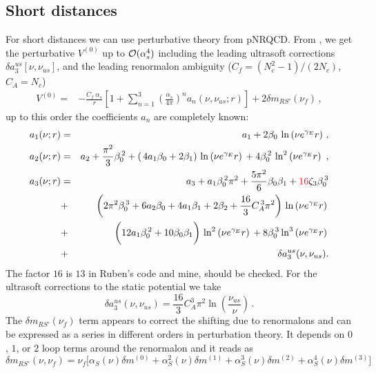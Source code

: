 \documentclass[11pt, a4paper]{article}
\begin{document}
\subsection{Short distances}
For short distances we can use perturbative theory from pNRQCD. From \cite{Pineda:2013lta}, we get the perturbative $V^{(0)}$ up to ${\cal O}(\alpha_s^4)$ including the leading ultrasoft corrections $\delta a_3^{us}[\nu,\nu_{us}]$, and the leading renormalon ambiguity ($C_f=(N_c^2-1)/(2N_c)$, $C_A=N_c$)
\begin{align}
    V^{(0)}=&
-\frac{C_f \ \alpha_s}{r}\left[1+
\sum_{n=1}^{3} 
\left(\frac{\alpha_s}{4\pi}\right)^n a_{n}(\nu,\nu_{us} ; r)\right]+2 \delta m_{RS'}(\nu_f) \, ,
\end{align}
up to this order the coefficients $a_n$ are completely known:
\begin{eqnarray}
a_1(\nu;r)
&=&
a_1+2\beta_0\,\ln\left(\nu e^{\gamma_E} r\right)
\,,
\nonumber\\
a_2(\nu;r)
&=&
a_2 + \frac{\pi^2}{3}\beta_0^{\,2}
+\left(\,4a_1\beta_0+2\beta_1 \right)\,\ln\left(\nu e^{\gamma_E} r\right)\,
+4\beta_0^{\,2}\,\ln^2\left(\nu e^{\gamma_E} r\right)\,
\,,
\nonumber \\
a_3(\nu;r)
&=&
a_3+ a_1\beta_0^{\,2} \pi^2+
\frac{5\pi^2}{6}\beta_0\beta_1 +{\color{red}16}\zeta_3\beta_0^{\,3}
\nonumber \\
&+&\bigg(2\pi^2\beta_0^{\,3} 
+ 6a_2\beta_0+4a_1\beta_1+2\beta_2
+\frac{16}{3}C_A^{\,3}\pi^2\bigg)\,
  \ln\left(\nu e^{\gamma_E} r\right)\,
\nonumber \\
&+&\bigg(12a_1\beta_0^{\,2}+10\beta_0\beta_1\bigg)\,
  \ln^2\left(\nu e^{\gamma_E} r\right)\,
+8\beta_0^{\,3}  \ln^3\left(\nu e^{\gamma_E} r\right)\,
\nonumber
\\
&+&\delta a_3^{us}(\nu,\nu_{us}).
\label{eq:Vr}
\end{eqnarray}
{\color{red} The factor $16$ is $13$ in Ruben's code and mine, should be checked.}
For the
ultrasoft corrections to the static potential we take
\begin{equation}
\delta a_3^{us}(\nu,\nu_{us})
= \frac{16}{3}C_A^3 \pi^2\ln\left(\frac{\nu_{us}}{\nu}\right)
\, .
\end{equation}
The $\delta m_{RS'}(\nu_f)$ term appears to correct the shifting due to renormalons and can be expressed as a series in different orders in perturbation theory. It depends on $0$, $1$, or $2$ loop terms around the renormalon and it reads as
\begin{equation}
    \delta m_{RS'}(\nu,\nu_f) = \nu_f \Big[ \alpha_S
(\nu) \delta m^{(0)} + \alpha_S^2
(\nu) \delta m^{(1)} + \alpha_S^3
(\nu) \delta m^{(2)} + \alpha_S^4
(\nu) \delta m^{(3)} \Big]
\end{equation}
\end{document}
